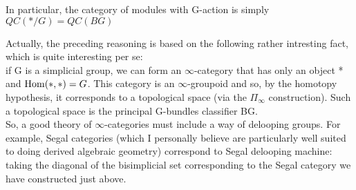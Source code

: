 \begin{refsection}
In particular, the category of modules with G-action is simply $QC(*/G)=QC(BG)$

\begin{rmk}
Actually, the preceding reasoning is based on the following rather intresting fact, which is quite interesting per se:\\
if G is a simplicial group, we can form an $\infty$-category that has only an object * and $\mathrm{Hom}(*,*)=G$. This category is an $\infty$-groupoid and so, by the homotopy
hypothesis, it corresponds to a topological space (via the $\Pi_{\infty}$ construction). Such a topological space is the principal G-bundles classifier BG.\\
So, a good theory of $\infty$-categories must include a way of delooping groups. For example, Segal categories (which I personally believe are particularly well suited to
doing derived algebraic geometry) correspond to Segal delooping machine: taking the diagonal of the bisimplicial set corresponding to the Segal category we have constructed
just above.
\end{rmk}

\nocite{hypercover, htt, ha, to1, to2, to3}
\printbibliography[heading = local]

\end{refsection}
